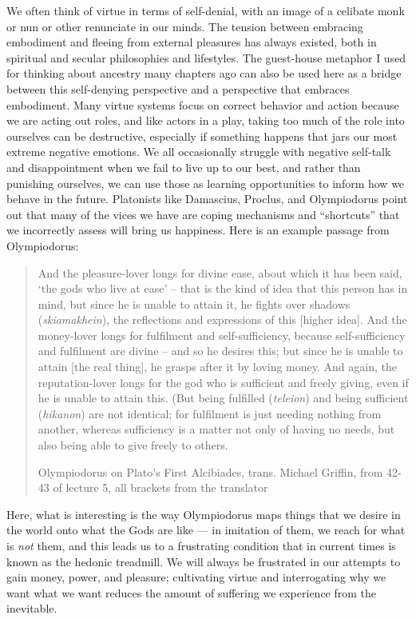\documentclass[
]{book}
\begin{document}
We often think of virtue in terms of self-denial, with an image of a celibate monk or nun or other renunciate in our minds. The tension between embracing embodiment and fleeing from external pleasures has always existed, both in spiritual and secular philosophies and lifestyles. The guest-house metaphor I used for thinking about ancestry many chapters ago can also be used here as a bridge between this self-denying perspective and a perspective that embraces embodiment. Many virtue systems focus on correct behavior and action because we are acting out roles, and like actors in a play, taking too much of the role into ourselves can be destructive, especially if something happens that jars our most extreme negative emotions. We all occasionally struggle with negative self-talk and disappointment when we fail to live up to our best, and rather than punishing ourselves, we can use those as learning opportunities to inform how we behave in the future. Platonists like Damascius, Proclus, and Olympiodorus point out that many of the vices we have are coping mechanisms and ``shortcuts'' that we incorrectly assess will bring us happiness. Here is an example passage from Olympiodorus:

\begin{quote}
And the pleasure-lover longs for divine ease, about which it has been said, `the gods who live at ease' -- that is the kind of idea that this person has in mind, but since he is unable to attain it, he fights over shadows (\emph{skiamakhein}), the reflections and expressions of this {[}higher idea{]}. And the money-lover longs for fulfilment and self-sufficiency, because self-sufficiency and fulfilment are divine -- and so he desires this; but since he is unable to attain {[}the real thing{]}, he grasps after it by loving money. And again, the reputation-lover longs for the god who is sufficient and freely giving, even if he is unable to attain this. (But being fulfilled (\emph{teleion}) and being sufficient (\emph{hikanon}) are not identical; for fulfilment is just needing nothing from another, whereas sufficiency is a matter not only of having no needs, but also being able to give freely to others.

Olympiodorus on Plato's First Alcibiades, trans. Michael Griffin, from 42-43 of lecture 5, all brackets from the translator
\end{quote}

Here, what is interesting is the way Olympiodorus maps things that we desire in the world onto what the Gods are like --- in imitation of them, we reach for what is \emph{not} them, and this leads us to a frustrating condition that in current times is known as the hedonic treadmill. We will always be frustrated in our attempts to gain money, power, and pleasure; cultivating virtue and interrogating why we want what we want reduces the amount of suffering we experience from the inevitable.
\end{document}
